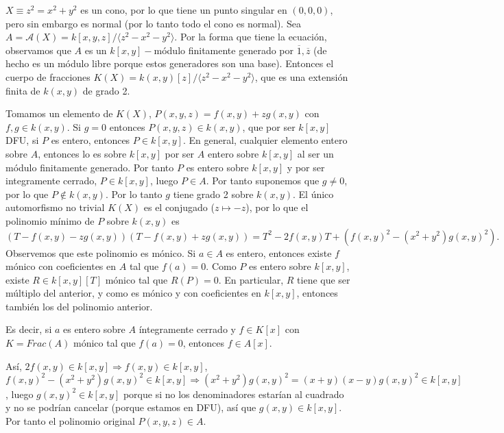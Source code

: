 \documentclass[ACGA.tex]{subfiles}
\begin{document}
\begin{ejs}
$X\equiv z^2=x^2+y^2$ es un cono, por lo que tiene un punto singular en $(0,0,0)$, pero sin embargo es normal (por lo tanto todo el cono es normal). Sea $A=\mathcal{A}(X)=k[x,y,z]/\langle z^2-x^2-y^2\rangle$. Por la forma que tiene la ecuación, observamos que $A$ es un $k[x,y]-$módulo finitamente generado por $\overline{1},\overline{z}$ (de hecho es un módulo libre porque estos generadores son una base). Entonces el cuerpo de fracciones $K(X)=k(x,y)[z]/\langle z^2-x^2-y^2\rangle$, que es una extensión finita de $k(x,y)$ de grado 2.  

Tomamos un elemento de $K(X)$, $P(x,y,z)=f(x,y)+zg(x,y)$ con $f,g\in k(x,y)$. Si $g=0$ entonces $P(x,y,z)\in k(x,y)$, que por ser $k[x,y]$ DFU, si $P$ es entero, entonces $P\in k[x,y]$.  En general, cualquier elemento entero sobre $A$, entonces lo es sobre $k[x,y]$ por ser $A$ entero sobre $k[x,y]$ al ser un módulo finitamente generado. Por tanto $P$ es entero sobre $k[x,y]$ y por ser integramente cerrado, $P\in k[x,y]$, luego $P\in A$. Por tanto suponemos que $g\neq 0$, por lo que $P\notin k(x,y)$. Por lo tanto $g$ tiene grado 2 sobre $k(x,y)$. El único automorfismo no trivial $K(X)$ es el conjugado ($z\mapsto -z$), por lo que el polinomio mínimo de $P$ sobre $k(x,y)$ es
$$(T-f(x,y)-zg(x,y))(T-f(x,y)+zg(x,y))=T^2-2f(x,y)T+(f(x,y)^2-(x^2+y^2)g(x,y)^2).$$
Observemos que este polinomio es mónico. Si $a\in A$ es entero, entonces existe $f$ mónico con coeficientes en $A$ tal que $f(a)=0$. Como $P$ es entero sobre $k[x,y]$, existe $R\in k[x,y][T]$ mónico tal que $R(P)=0$. En particular, $R$ tiene que ser múltiplo del anterior, y como es mónico y con coeficientes en $k[x,y]$, entonces también los del polinomio anterior.

Es decir, si $a$ es entero sobre $A$ íntegramente cerrado y $f\in K[x]$ con $K=Frac(A)$ mónico tal que $f(a)=0$, entonces $f\in A[x]$. 

Así, $2f(x,y)\in k[x,y]\Rightarrow f(x,y)\in k[x,y]$, $f(x,y)^2-(x^2+y^2)g(x,y)^2\in k[x,y]\Rightarrow (x^2+y^2)g(x,y)^2=(x+y)(x-y)g(x,y)^2\in k[x,y]$, luego $g(x,y)^2\in k[x,y]$ porque si no los denominadores estarían al cuadrado y no se podrían cancelar (porque estamos en DFU), así que $g(x,y)\in k[x,y]$. Por tanto el polinomio original $P(x,y,z)\in A$. 
\end{ejs}
\end{document}
